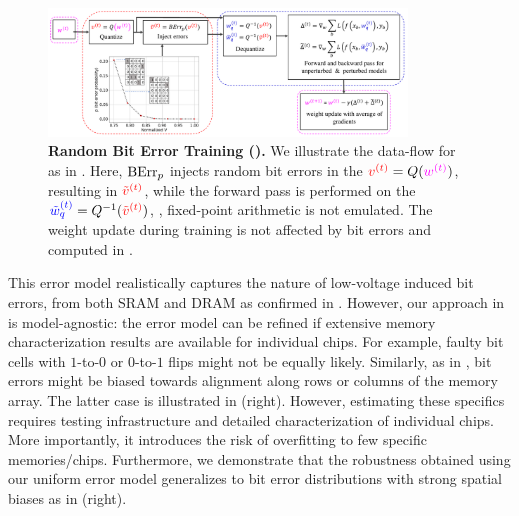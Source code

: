 \begin{figure}
    \vspace*{-0.15cm}
    \centering
    \includegraphics[width=0.85\textwidth]{main_training_flow4.pdf}
    \vspace*{-6px}
    \caption{\textbf{Random Bit Error Training (\Random).} We illustrate the data-flow for \Random as in . Here, $\biterror_p$ injects random bit errors in the  $\red{v^{(t)}} = Q(\magenta{w^{(t)}})$, resulting in $\red{\tilde{v}^{(t)}}$, while the forward pass is performed on the  $\blue{\tilde{w}_q^{(t)}} = Q^{-1}(\red{\tilde{v}^{(t)}})$, \ie, fixed-point arithmetic is not emulated. The weight update during training is not affected by bit errors and computed in .}
    \label{fig:flowchart}
    \vspace*{-0.2cm}
\end{figure}

This error model realistically captures the nature of low-voltage induced bit errors, from both SRAM and DRAM as confirmed in \cite{ChandramoorthyHPCA2019,KimDATE2018,KoppulaMICRO2019}. However, our approach in  is model-agnostic: the error model can be refined if extensive memory characterization results are available for individual chips. For example, faulty bit cells with $1$-to-$0$ or $0$-to-$1$ flips might not be equally likely. Similarly, as in \cite{KoppulaMICRO2019}, bit errors might be biased towards alignment along rows or columns of the memory array. The latter case is illustrated in  (right). However, estimating these specifics requires testing infrastructure and detailed characterization of individual chips. 
More importantly, it introduces the risk of overfitting to few specific memories/chips. 
Furthermore, we demonstrate that the robustness obtained using our uniform error model generalizes to bit error distributions with strong spatial biases as in  (right).


